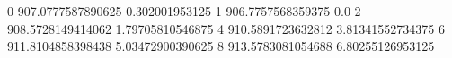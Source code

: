 0 907.0777587890625 0.302001953125
1 906.7757568359375 0.0
2 908.5728149414062 1.79705810546875
4 910.5891723632812 3.81341552734375
6 911.8104858398438 5.03472900390625
8 913.5783081054688 6.80255126953125
